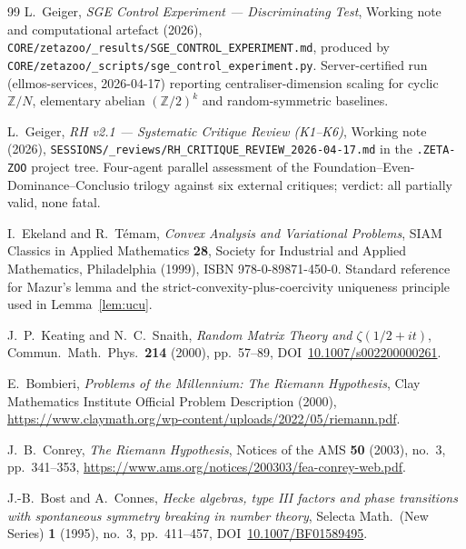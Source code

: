 \documentclass[11pt]{article}
\theoremstyle{definition}
\theoremstyle{remark}
\begin{document}
\begin{thebibliography}{99}
L.~Geiger, \emph{SGE Control Experiment --- Discriminating Test},
Working note and computational artefact (2026),
\texttt{CORE/zetazoo/\_results/SGE\_CONTROL\_EXPERIMENT.md},
produced by
\texttt{CORE/zetazoo/\_scripts/sge\_control\_experiment.py}.
Server-certified run (ellmos-services, 2026-04-17) reporting
centraliser-dimension scaling for cyclic $\mathbb{Z}/N$,
elementary abelian $(\mathbb{Z}/2)^k$ and random-symmetric
baselines.

L.~Geiger, \emph{RH v2.1 --- Systematic Critique Review (K1--K6)},
Working note (2026), \texttt{SESSIONS/\_reviews/RH\_CRITIQUE\_REVIEW\_2026-04-17.md}
in the \texttt{.ZETA-ZOO} project tree.
Four-agent parallel assessment of the Foundation--Even-Dominance--Conclusio
trilogy against six external critiques; verdict: all partially valid,
none fatal.

I.~Ekeland and R.~T\'emam, \emph{Convex Analysis and Variational
Problems}, SIAM Classics in Applied Mathematics \textbf{28}, Society
for Industrial and Applied Mathematics, Philadelphia (1999),
ISBN 978-0-89871-450-0. Standard reference for Mazur's lemma and
the strict-convexity-plus-coercivity uniqueness principle used in
Lemma~\ref{lem:ucu}.


J.~P.~Keating and N.~C.~Snaith, \emph{Random Matrix Theory and
$\zeta(1/2 + it)$}, Commun.\ Math.\ Phys.\ \textbf{214} (2000),
pp.~57--89, DOI~\href{https://doi.org/10.1007/s002200000261}{10.1007/s002200000261}.

E.~Bombieri, \emph{Problems of the Millennium: The Riemann
Hypothesis}, Clay Mathematics Institute Official Problem
Description (2000),
\url{https://www.claymath.org/wp-content/uploads/2022/05/riemann.pdf}.

J.~B.~Conrey, \emph{The Riemann Hypothesis}, Notices of the AMS
\textbf{50} (2003), no.~3, pp.~341--353,
\url{https://www.ams.org/notices/200303/fea-conrey-web.pdf}.

J.-B.~Bost and A.~Connes, \emph{Hecke algebras, type III factors
and phase transitions with spontaneous symmetry breaking in number
theory}, Selecta Math.\ (New Series) \textbf{1} (1995), no.~3,
pp.~411--457,
DOI~\href{https://doi.org/10.1007/BF01589495}{10.1007/BF01589495}.


\end{thebibliography}
\end{document}
